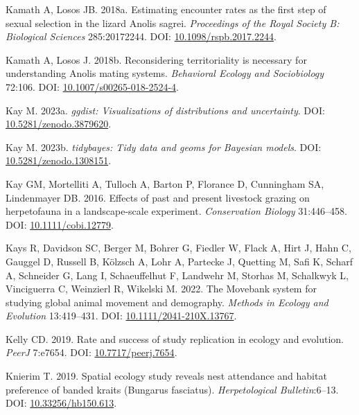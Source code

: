\documentclass[10pt,a4paper]{article}
\newlength{\cslhangindent}
\newenvironment{CSLReferences}[2] %
 {\begin{list}{}{%
  \setlength{\itemindent}{0pt}
  \setlength{\leftmargin}{0pt}
  \setlength{\parsep}{0pt}
  \ifodd #1
   \setlength{\leftmargin}{\cslhangindent}
   \setlength{\itemindent}{-1\cslhangindent}
  \fi
  \setlength{\itemsep}{#2\baselineskip}}}
 {\end{list}}
\begin{document}
\begin{CSLReferences}{1}{0}
Kamath A, Losos JB. 2018a. Estimating encounter rates as the first step of sexual selection in the lizard {Anolis} sagrei. \emph{Proceedings of the Royal Society B: Biological Sciences} 285:20172244. DOI: \href{https://doi.org/10.1098/rspb.2017.2244}{10.1098/rspb.2017.2244}.

Kamath A, Losos J. 2018b. Reconsidering territoriality is necessary for understanding {Anolis} mating systems. \emph{Behavioral Ecology and Sociobiology} 72:106. DOI: \href{https://doi.org/10.1007/s00265-018-2524-4}{10.1007/s00265-018-2524-4}.

Kay M. 2023a. \emph{{ggdist}: Visualizations of distributions and uncertainty}. DOI: \href{https://doi.org/10.5281/zenodo.3879620}{10.5281/zenodo.3879620}.

Kay M. 2023b. \emph{{tidybayes}: Tidy data and geoms for {Bayesian} models}. DOI: \href{https://doi.org/10.5281/zenodo.1308151}{10.5281/zenodo.1308151}.

Kay GM, Mortelliti A, Tulloch A, Barton P, Florance D, Cunningham SA, Lindenmayer DB. 2016. Effects of past and present livestock grazing on herpetofauna in a landscape-scale experiment. \emph{Conservation Biology} 31:446--458. DOI: \href{https://doi.org/10.1111/cobi.12779}{10.1111/cobi.12779}.

Kays R, Davidson SC, Berger M, Bohrer G, Fiedler W, Flack A, Hirt J, Hahn C, Gauggel D, Russell B, Kölzsch A, Lohr A, Partecke J, Quetting M, Safi K, Scharf A, Schneider G, Lang I, Schaeuffelhut F, Landwehr M, Storhas M, Schalkwyk L, Vinciguerra C, Weinzierl R, Wikelski M. 2022. The {Movebank} system for studying global animal movement and demography. \emph{Methods in Ecology and Evolution} 13:419--431. DOI: \href{https://doi.org/10.1111/2041-210X.13767}{10.1111/2041-210X.13767}.

Kelly CD. 2019. Rate and success of study replication in ecology and evolution. \emph{PeerJ} 7:e7654. DOI: \href{https://doi.org/10.7717/peerj.7654}{10.7717/peerj.7654}.

Knierim T. 2019. Spatial ecology study reveals nest attendance and habitat preference of banded kraits ({Bungarus} fasciatus). \emph{Herpetological Bulletin}:6--13. DOI: \href{https://doi.org/10.33256/hb150.613}{10.33256/hb150.613}.


\end{CSLReferences}
\end{document}
